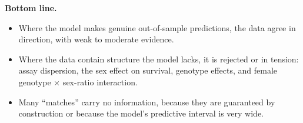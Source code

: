 \textbf{Bottom line.}
\begin{itemize}
\item Where the model makes genuine out-of-sample predictions, the data agree in direction, with weak to moderate evidence.
\item Where the data contain structure the model lacks, it is rejected or in tension: assay dispersion, the sex effect on survival, genotype effects, and female genotype $\times$ sex-ratio interaction.
\item Many ``matches'' carry no information, because they are guaranteed by construction or because the model's predictive interval is very wide.
\end{itemize}
